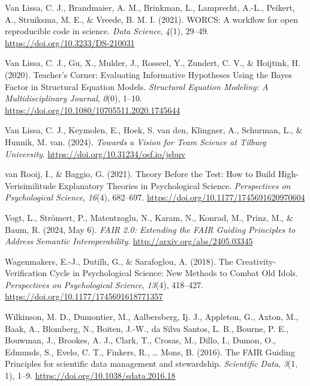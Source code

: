 \documentclass[
  man, noextraspace,floatsintext]{apa7}
\newlength{\cslhangindent}
\newenvironment{CSLReferences}[2] %
 {\begin{list}{}{%
  \setlength{\itemindent}{0pt}
  \setlength{\leftmargin}{0pt}
  \setlength{\parsep}{0pt}
  \ifodd #1
   \setlength{\leftmargin}{\cslhangindent}
   \setlength{\itemindent}{-1\cslhangindent}
  \fi
  \setlength{\itemsep}{#2\baselineskip}}}
 {\end{list}}
\begin{document}
\begin{CSLReferences}{1}{0}
Van Lissa, C. J., Brandmaier, A. M., Brinkman, L., Lamprecht, A.-L., Peikert, A., Struiksma, M. E., \& Vreede, B. M. I. (2021). {WORCS}: {A} workflow for open reproducible code in science. \emph{Data Science}, \emph{4}(1), 29--49. \url{https://doi.org/10.3233/DS-210031}

Van Lissa, C. J., Gu, X., Mulder, J., Rosseel, Y., Zundert, C. V., \& Hoijtink, H. (2020). Teacher's {Corner}: {Evaluating Informative Hypotheses Using} the {Bayes Factor} in {Structural Equation Models}. \emph{Structural Equation Modeling: A Multidisciplinary Journal}, \emph{0}(0), 1--10. \url{https://doi.org/10.1080/10705511.2020.1745644}

Van Lissa, C. J., Keymolen, E., Hoek, S. van den, Klingner, A., Schurman, L., \& Hunnik, M. van. (2024). \emph{Towards a {Vision} for {Team Science} at {Tilburg University}}. \url{https://doi.org/10.31234/osf.io/jsbuv}

van Rooij, I., \& Baggio, G. (2021). Theory {Before} the {Test}: {How} to {Build High-Verisimilitude Explanatory Theories} in {Psychological Science}. \emph{Perspectives on Psychological Science}, \emph{16}(4), 682--697. \url{https://doi.org/10.1177/1745691620970604}

Vogt, L., Strömert, P., Matentzoglu, N., Karam, N., Konrad, M., Prinz, M., \& Baum, R. (2024, May 6). \emph{{FAIR} 2.0: {Extending} the {FAIR Guiding Principles} to {Address Semantic Interoperability}}. \url{http://arxiv.org/abs/2405.03345}

Wagenmakers, E.-J., Dutilh, G., \& Sarafoglou, A. (2018). The {Creativity-Verification Cycle} in {Psychological Science}: {New Methods} to {Combat Old Idols}. \emph{Perspectives on Psychological Science}, \emph{13}(4), 418--427. \url{https://doi.org/10.1177/1745691618771357}

Wilkinson, M. D., Dumontier, M., Aalbersberg, Ij. J., Appleton, G., Axton, M., Baak, A., Blomberg, N., Boiten, J.-W., da Silva Santos, L. B., Bourne, P. E., Bouwman, J., Brookes, A. J., Clark, T., Crosas, M., Dillo, I., Dumon, O., Edmunds, S., Evelo, C. T., Finkers, R., \ldots{} Mons, B. (2016). The {FAIR Guiding Principles} for scientific data management and stewardship. \emph{Scientific Data}, \emph{3}(1, 1), 1--9. \url{https://doi.org/10.1038/sdata.2016.18}


\end{CSLReferences}
\end{document}
